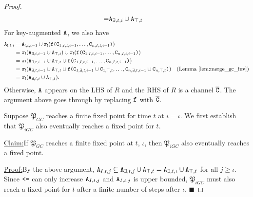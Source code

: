 \documentclass{article}
\numberwithin{equation}{section}
\newenvironment{claim}[1]{\par\noindent\underline{Claim:}\space#1}{}
\newenvironment{claimproof}[1]{\par\noindent\underline{Proof:}\space#1}{\hfill $\blacksquare$}
\renewcommand{\tt}[1]{\ifmmode\text{\texttt{#1}}\else\texttt{#1}\fi}
\begin{document}
\begin{proof}
\begin{align*}
=& \tt{A}_{\exists,t,i} \cup \tt{A}_{\top,t}
\end{align*}
For key-augmented $\tt{A}$, we also have
\begin{align*}
\tt{A}_{!,t,i}
&= \tt{A}_{!,t,i-1} \cup \pi_!(\tt{f}\tt{(}\tt{C}_{1,I,t,i-1}, \dots, \tt{C}_{n,I,t,i-1}\tt{)})\\
&= \pi_!(\tt{A}_{\exists,t,i-1} \cup \tt{A}_{\top,t}) \cup \pi_!(\tt{f}\tt{(}\tt{C}_{1,I,t,i-1}, \dots, \tt{C}_{n,I,t,i-1}\tt{)})\\
&= \pi_!(\tt{A}_{\exists,t,i-1} \cup \tt{A}_{\top,t} \cup \tt{f}\tt{(}\tt{C}_{1,I,t,i-1}, \dots, \tt{C}_{n,I,t,i-1}\tt{)})\\
&= \pi_!(\tt{A}_{\exists,t,i-1} \cup \tt{A}_{\top,t} \cup \tt{f}\tt{(}\tt{C}_{1,\exists,t,i-1} \cup \tt{C}_{1,\top,t}, \dots, \tt{C}_{n,\exists,t,i-1} \cup \tt{C}_{n,\top,t}\tt{)}) & \text{(Lemma \ref{lem:merge_gc_inv})}\\
&= \pi_!(\tt{A}_{\exists,t,i} \cup \tt{A}_{\top,t}).
\end{align*}
Otherwise, $\tt{A}$ appears on the LHS of $R$ and the RHS of $R$ is a channel $\overline{\tt{C}}$.
The argument above goes through by replacing $\tt{f}$ with $\overline{\tt{C}}$.

Suppose $\mathfrak{P}_{GC}$ reaches a finite fixed point for time $t$ at $i=\iota$.
We first establish that $\mathfrak{P}_{iGC}$ also eventually reaches a fixed point for $t$.
\begin{claim}
If $\mathfrak{P}_{GC}$ reaches a finite fixed point at $t$, $\iota$, then $\mathfrak{P}_{iGC}$ also eventually reaches a fixed point.
\end{claim}
\begin{claimproof}
By the above argument, $\tt{A}_{I,t,j} \subseteq \tt{A}_{\exists,t,j} \cup \tt{A}_{\top,t} = \tt{A}_{\exists,t,\iota} \cup \tt{A}_{\top,t}$ for all $j \geq \iota$.
Since $\tt{<=}$ can only increase $\tt{A}_{I,t,j}$ and $\tt{A}_{I,t,j}$ is upper bounded, $\mathfrak{P}_{iGC}$ must also reach a fixed point for $t$ after a finite number of steps after $\iota$.
\end{claimproof}


\end{proof}
\end{document}
